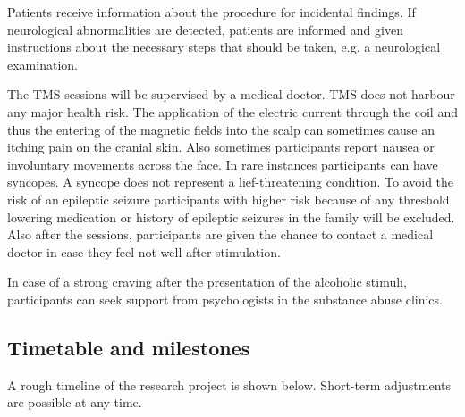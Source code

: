 \documentclass[12pt]{article}
\begin{document}
Patients receive information about the procedure for incidental findings. If neurological abnormalities are detected, patients are informed and given instructions about the necessary steps that should be taken, e.g. a neurological examination.

The TMS sessions will be supervised by a medical doctor. TMS does not harbour any major health risk. The application of the electric current through the coil and thus the entering of the magnetic fields into the scalp can sometimes cause an itching pain on the cranial skin. Also sometimes participants report nausea or involuntary movements across the face. In rare instances participants can have syncopes. A syncope does not represent a lief-threatening condition. To avoid the risk of an epileptic seizure participants with higher risk because of any threshold lowering medication or history of epileptic seizures in the family will be excluded. Also after the sessions, participants are given the chance to contact a medical doctor in case they feel not well after stimulation. 

In case of a strong craving after the presentation of the alcoholic stimuli, participants can seek support from psychologists in the substance abuse clinics.
 

\subsection{Timetable and milestones}
A rough timeline of the research project is shown below. Short-term adjustments are possible at any time.
\end{document}
